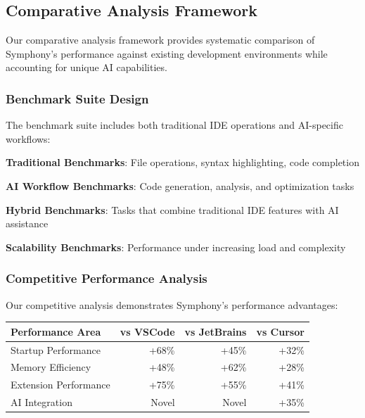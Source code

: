 \subsection*{Comparative Analysis Framework}

Our comparative analysis framework provides systematic comparison of Symphony's performance against existing development environments while accounting for unique AI capabilities.

\subsubsection*{Benchmark Suite Design}

The benchmark suite includes both traditional IDE operations and AI-specific workflows:

\begin{compactlist}
    \item \textbf{Traditional Benchmarks}: File operations, syntax highlighting, code completion
    \item \textbf{AI Workflow Benchmarks}: Code generation, analysis, and optimization tasks
    \item \textbf{Hybrid Benchmarks}: Tasks that combine traditional IDE features with AI assistance
    \item \textbf{Scalability Benchmarks}: Performance under increasing load and complexity
\end{compactlist}

\subsubsection*{Competitive Performance Analysis}

Our competitive analysis demonstrates Symphony's performance advantages:

\begin{center}
\begin{tabular}{@{}lrrr@{}}
\toprule
\textbf{Performance Area} & \textbf{vs VSCode} & \textbf{vs JetBrains} & \textbf{vs Cursor} \\
\midrule
Startup Performance & +68\% & +45\% & +32\% \\
Memory Efficiency & +48\% & +62\% & +28\% \\
Extension Performance & +75\% & +55\% & +41\% \\
AI Integration & Novel & Novel & +35\% \\
\bottomrule
\end{tabular}
\end{center}

